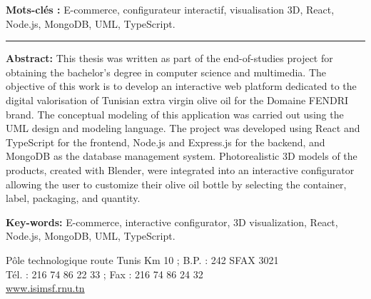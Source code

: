 \noindent\textbf{Mots-clés :} E-commerce, configurateur interactif, visualisation 3D, React, Node.js, MongoDB, UML, TypeScript.

\vspace{0.5cm}
\textcolor{or}{\rule{\textwidth}{0.4pt}}
\vspace{0.5cm}

\noindent\textbf{Abstract:} This thesis was written as part of the end-of-studies project for obtaining the bachelor's degree in computer science and multimedia. The objective of this work is to develop an interactive web platform dedicated to the digital valorisation of Tunisian extra virgin olive oil for the Domaine FENDRI brand. The conceptual modeling of this application was carried out using the UML design and modeling language. The project was developed using React and TypeScript for the frontend, Node.js and Express.js for the backend, and MongoDB as the database management system. Photorealistic 3D models of the products, created with Blender, were integrated into an interactive configurator allowing the user to customize their olive oil bottle by selecting the container, label, packaging, and quantity.

\noindent\textbf{Key-words:} E-commerce, interactive configurator, 3D visualization, React, Node.js, MongoDB, UML, TypeScript.

\vspace{\fill}

\begin{center}
\textcolor{gris}{\small
Pôle technologique route Tunis Km 10 ; B.P. : 242 SFAX 3021\\
Tél. : 216 74 86 22 33 ; Fax : 216 74 86 24 32\\
\url{www.isimsf.rnu.tn}
}
\end{center}

